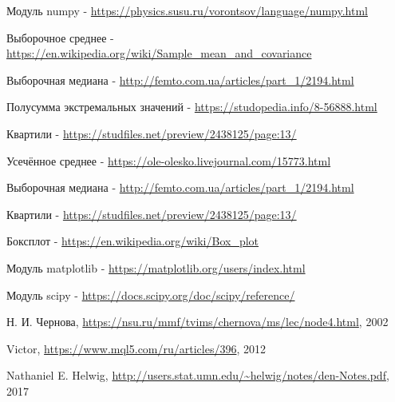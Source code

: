 \documentclass[a4]{article}
\begin{document}
\begin{thebibliography}{}

       Модуль numpy  -  \url{https://physics.susu.ru/vorontsov/language/numpy.html}
    
    Выборочное среднее  -  \url{https://en.wikipedia.org/wiki/Sample\_mean\_and\_covariance}
    
    Выборочная медиана  -  \url{http://femto.com.ua/articles/part\_1/2194.html}
    
    Полусумма экстремальных значений  -  \url{https://studopedia.info/8-56888.html}
    
    Квартили  -  \url{https://studfiles.net/preview/2438125/page:13/}
    
      Усечённое среднее  -  \url{https://ole-olesko.livejournal.com/15773.html}
    
    
    
    Выборочная медиана  -  \url{http://femto.com.ua/articles/part\_1/2194.html}
    
    Квартили -  \url{https://studfiles.net/preview/2438125/page:13/}
    
    Боксплот - \url{https://en.wikipedia.org/wiki/Box\_plot}

    Модуль matplotlib - \url{https://matplotlib.org/users/index.html}
    
    Модуль scipy - \url{https://docs.scipy.org/doc/scipy/reference/}
    

    Н. И. Чернова, \url{https://nsu.ru/mmf/tvims/chernova/ms/lec/node4.html}, 2002
    
    Victor, \url{https://www.mql5.com/ru/articles/396}, 2012
    
    Nathaniel E. Helwig, \url{http://users.stat.umn.edu/\~helwig/notes/den-Notes.pdf}, 2017

    
    
\end{thebibliography}
\end{document}
